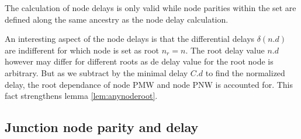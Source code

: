 \begin{lemma}\label{lem:nodecalc_ancestrypath}
 The calculation of node delays is only valid while node parities within the set are defined along the same ancestry as the node delay calculation.
\end{lemma}

An interesting aspect of the node delays is that the differential delays $\delta(n.d)$ are indifferent for which node is set as root $n_r = n$. The root delay value $n.d$ however may differ for different roots as de delay value for the root node is arbitrary. But as we subtract by the minimal delay $C.d$ to find the normalized delay, the root dependance of node PMW and node PNW is accounted for. This fact strengthens lemma \ref{lem:anynoderoot}.

\subsection{Junction node parity and delay}

